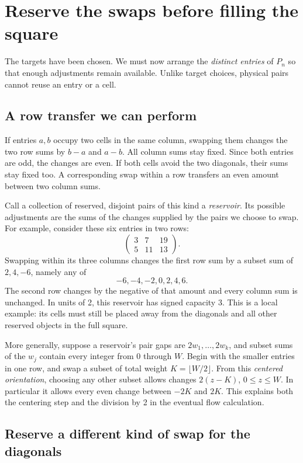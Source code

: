 \documentclass[11pt]{article}
\theoremstyle{definition}
\begin{document}
\section{Reserve the swaps before filling the square}\label{sec:reserve}

The targets have been chosen. We must now arrange the \emph{distinct entries}
of \(P_n\) so that enough adjustments remain available. Unlike target choices,
physical pairs cannot reuse an entry or a cell.

\subsection{A row transfer we can perform}

If entries \(a,b\) occupy two cells in the same column, swapping them changes
the two row sums by \(b-a\) and \(a-b\). All column sums stay fixed. Since
both entries are odd, the changes are even. If both cells avoid the two
diagonals, their sums stay fixed too. A corresponding swap within a row
transfers an even amount between two column sums.

Call a collection of reserved, disjoint pairs of this kind a \emph{reservoir}.
Its possible adjustments are the sums of the changes supplied by the pairs
we choose to swap. For example, consider these six entries in two rows:
\[
 \begin{pmatrix}3&7&19\\5&11&13\end{pmatrix}.
\]
Swapping within its three columns changes the first row sum by a subset sum
of \(2,4,-6\), namely any of
\[
 -6,-4,-2,0,2,4,6.
\]
The second row changes by the negative of that amount and every column sum
is unchanged. In units of 2, this reservoir has signed capacity 3. This is a
local example: its cells must still be placed away from the diagonals and all
other reserved objects in the full square.

More generally, suppose a reservoir's pair gaps are \(2w_1,\ldots,2w_k\), and
subset sums of the \(w_j\) contain every integer from 0 through \(W\). Begin
with the smaller entries in one row, and swap a subset of total weight
\(K=\lfloor W/2\rfloor\). From this \emph{centered orientation}, choosing any
other subset allows changes \(2(z-K)\), \(0\le z\le W\). In particular it
allows every even change between \(-2K\) and \(2K\). This explains both the
centering step and the division by 2 in the eventual flow calculation.

\subsection{Reserve a different kind of swap for the diagonals}\label{subsec:rectangles}
\end{document}

